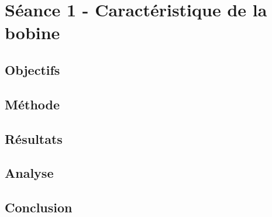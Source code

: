 

\section{Séance 1 - Caractéristique de la bobine }

\subsection{Objectifs}

\subsection{Méthode}

\subsection{Résultats}

\subsection{Analyse}

\subsection{Conclusion}

